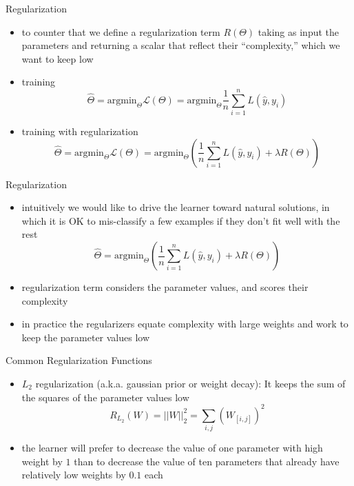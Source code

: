 \documentclass[12pt]{beamer}
\begin{document}
\iffalse
\begin{frame}{Regularization}
	\begin{itemize}
		
		\item<1-> to counter that we define a regularization term $R(\Theta)$ taking as input the parameters and returning a scalar that reflect their ``complexity,'' which we want to keep low
		
		\item<2-> training 
		\begin{equation*}
			\hat{\Theta} = \text{argmin}_{\Theta} \mathcal{L}(\Theta) =\text{argmin}_{\Theta} \frac{1}{n}\sum_{i=1}^{n}L(\hat{y},y_i) 
		\end{equation*}
		
		\item<3-> training with regularization
		\begin{equation*}
			\hat{\Theta} = \text{argmin}_{\Theta} \mathcal{L}(\Theta) =\text{argmin}_{\Theta} \left( \frac{1}{n}\sum_{i=1}^{n}L(\hat{y},y_i)  + \lambda R(\Theta) \right)
		\end{equation*}
	\end{itemize}
\end{frame}
\begin{frame}{Regularization}
	\begin{itemize}
		\item<1-> intuitively we would like to drive the learner toward natural solutions, in which it is OK to mis-classify a few examples if they don’t fit well with the rest
		\begin{equation*}
			\hat{\Theta} =\text{argmin}_{\Theta} \left( \frac{1}{n}\sum_{i=1}^{n}L(\hat{y},y_i)  + \lambda R(\Theta) \right)
		\end{equation*}
		\item<2-> regularization term considers the parameter values, and scores their complexity
		\item<3-> in practice the regularizers equate complexity with large weights and work to keep the parameter values low 
		
	\end{itemize}
\end{frame}
\begin{frame}{Common Regularization Functions}
	\begin{itemize}
		\item<1-> $L_2$ regularization (a.k.a. gaussian prior or weight decay): It keeps the sum of the squares of the parameter values low
		\begin{equation*}
			R_{L_2}(W) = ||W||_2^2 = \sum_{i,j}{(W_{[i,j]})^2}
		\end{equation*}
		\item<2-> the learner will prefer to decrease the value of one parameter with high weight by $1$ than to decrease the value of ten parameters that already have relatively low weights by $0.1$ each
	\end{itemize}
\end{frame}
\end{document}
